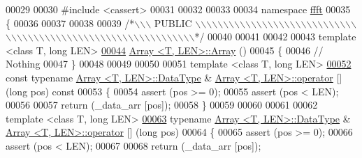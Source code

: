 \begin{DoxyCode}
00029 
00030 \textcolor{preprocessor}{#include    <cassert>}
00031 
00032 
00033 
00034 \textcolor{keyword}{namespace }\hyperlink{a00142}{ffft}
00035 \{
00036 
00037 
00038 
00039 \textcolor{comment}{/*\(\backslash\)\(\backslash\)\(\backslash\) PUBLIC \(\backslash\)\(\backslash\)\(\backslash\)\(\backslash\)\(\backslash\)\(\backslash\)\(\backslash\)\(\backslash\)\(\backslash\)\(\backslash\)\(\backslash\)\(\backslash\)\(\backslash\)\(\backslash\)\(\backslash\)\(\backslash\)\(\backslash\)\(\backslash\)\(\backslash\)\(\backslash\)\(\backslash\)\(\backslash\)\(\backslash\)\(\backslash\)\(\backslash\)\(\backslash\)\(\backslash\)\(\backslash\)\(\backslash\)\(\backslash\)\(\backslash\)\(\backslash\)\(\backslash\)\(\backslash\)\(\backslash\)\(\backslash\)\(\backslash\)\(\backslash\)\(\backslash\)\(\backslash\)\(\backslash\)\(\backslash\)\(\backslash\)\(\backslash\)\(\backslash\)\(\backslash\)\(\backslash\)\(\backslash\)\(\backslash\)\(\backslash\)\(\backslash\)\(\backslash\)\(\backslash\)\(\backslash\)\(\backslash\)\(\backslash\)\(\backslash\)\(\backslash\)\(\backslash\)\(\backslash\)\(\backslash\)\(\backslash\)\(\backslash\)*/}
00040 
00041 
00042 
00043 \textcolor{keyword}{template} <\textcolor{keyword}{class} T, \textcolor{keywordtype}{long} LEN>
\hypertarget{a00084_source_l00044}{}\hyperlink{a00003_a5bab4a19a26a0e2e3b455b6c023cf663}{00044} \hyperlink{a00003}{Array <T, LEN>::Array} ()
00045 \{
00046     \textcolor{comment}{// Nothing}
00047 \}
00048 
00049 
00050 
00051 \textcolor{keyword}{template} <\textcolor{keyword}{class} T, \textcolor{keywordtype}{long} LEN>
\hypertarget{a00084_source_l00052}{}\hyperlink{a00003_a8d2a3d1353646dfab3d578f148694e2b}{00052} \textcolor{keyword}{const} \textcolor{keyword}{typename} \hyperlink{a00003_a9c4e0bf048154331d63e74ddfdd3760b}{Array <T, LEN>::DataType} &   
      \hyperlink{a00003}{Array <T, LEN>::operator} [] (\textcolor{keywordtype}{long} pos) \textcolor{keyword}{const}
00053 \{
00054     assert (pos >= 0);
00055     assert (pos < LEN);
00056 
00057     \textcolor{keywordflow}{return} (\_data\_arr [pos]);
00058 \}
00059 
00060 
00061 
00062 \textcolor{keyword}{template} <\textcolor{keyword}{class} T, \textcolor{keywordtype}{long} LEN>
\hypertarget{a00084_source_l00063}{}\hyperlink{a00003_a61a01b3ce19d98183860c42d55a0cc2c}{00063} \textcolor{keyword}{typename} \hyperlink{a00003_a9c4e0bf048154331d63e74ddfdd3760b}{Array <T, LEN>::DataType} & 
      \hyperlink{a00003}{Array <T, LEN>::operator} [] (\textcolor{keywordtype}{long} pos)
00064 \{
00065     assert (pos >= 0);
00066     assert (pos < LEN);
00067 
00068     \textcolor{keywordflow}{return} (\_data\_arr [pos]);

\end{DoxyCode}
